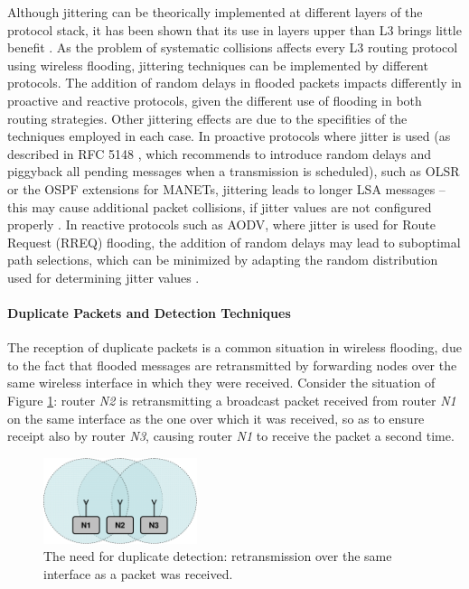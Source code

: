 %
Although jittering can be theorically implemented at different layers of the protocol stack, it has been shown that its use in layers upper than L3 brings little benefit \cite{jitter-broadcast}. As the problem of systematic collisions affects every L3 routing protocol using wireless flooding, jittering techniques can be implemented by different protocols. The addition of random delays in flooded packets impacts differently in proactive and reactive protocols, given the different use of flooding in both routing strategies. Other jittering effects are due to the specifities of the techniques employed in each case. In proactive protocols where jitter is used (as described in RFC 5148 \cite{jitter-RFC5148}, which recommends to introduce random delays and piggyback all pending messages when a transmission is scheduled), such as OLSR or the OSPF extensions for MANETs, jittering leads to longer LSA messages -- this may cause additional packet collisions, if jitter values are not configured properly \cite{INFOCOM-jitter,jitter-wpc}. In reactive protocols such as AODV, where jitter is used for Route Request (RREQ) flooding, the addition of random delays may lead to suboptimal path selections, which can be minimized by adapting the random distribution used for determining jitter values \cite{Infocom12, wiopt}.  

\paragraph{Duplicate Packets and Detection Techniques}

The reception of duplicate packets is a common situation in wireless flooding, due to the fact that flooded messages are retransmitted by forwarding nodes over the same wireless interface in which they were received. Consider the situation of Figure \ref{f:dpd}: router \textit{N2} is retransmitting a broadcast packet received from router \textit{N1} on the same interface as the one over which it was received, so as to ensure receipt also by router \textit{N3}, causing router \textit{N1} to receive the packet a second time.

\begin{figure}[ht]
\centering
\includegraphics[width=0.4\textwidth]{Figures/dpd.pdf}
\caption{The need for duplicate detection: retransmission over the same interface as a packet was received.}
\label{f:dpd}
\end{figure}

